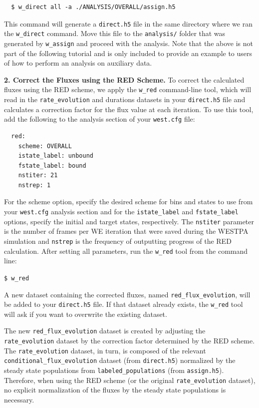 \begin{verbatim}
  $ w_direct all -a ./ANALYSIS/OVERALL/assign.h5
\end{verbatim}

This command will generate a \verb|direct.h5| file in the same directory where we ran the \verb|w_direct| command.
Move this file to the \verb|analysis/| folder that was generated by \verb|w_assign| and proceed with the analysis.
Note that the above is not part of the following tutorial and is only included to provide an example to users of how to perform an analysis on auxiliary data.

\textbf{2. Correct the Fluxes using the RED Scheme.} To correct the calculated fluxes using the RED scheme, we apply the \verb|w_red| command-line tool, which will read in the \verb|rate_evolution| and durations datasets in your \verb|direct.h5| file and calculates a correction factor for the flux value at each iteration.
To use this tool, add the following to the analysis section of your \verb|west.cfg| file:
\begin{verbatim}
  red:
    scheme: OVERALL
    istate_label: unbound
    fstate_label: bound
    nstiter: 21
    nstrep: 1
\end{verbatim}

\noindent For the scheme option, specify  the desired scheme for bins and states to use from your \verb|west.cfg| analysis section and for the \verb|istate_label| and \verb|fstate_label| options, specify the initial and target states, respectively.
The \verb|nstiter| parameter is the number of frames per WE iteration that were saved during the WESTPA simulation and \verb|nstrep| is the frequency of outputting progress of the RED calculation. After setting all parameters, run the \verb|w_red| tool from the command line:

\verb|$ w_red|

\noindent A new dataset containing the corrected fluxes, named \verb|red_flux_evolution|, will be added to your \verb|direct.h5| file.
If that dataset already exists, the \verb|w_red| tool will ask if you want to overwrite the existing dataset.

The new \verb|red_flux_evolution| dataset is created by adjusting the \verb|rate_evolution| dataset by the correction factor determined by the RED scheme.
The \verb|rate_evolution| dataset, in turn, is composed of the relevant \verb|conditional_flux_evolution| dataset (from \verb|direct.h5|) normalized by the steady state populations from \verb|labeled_populations| (from \verb|assign.h5|).
Therefore, when using the RED scheme (or the original \verb|rate_evolution| dataset), no explicit normalization of the fluxes by the steady state populations is necessary.

